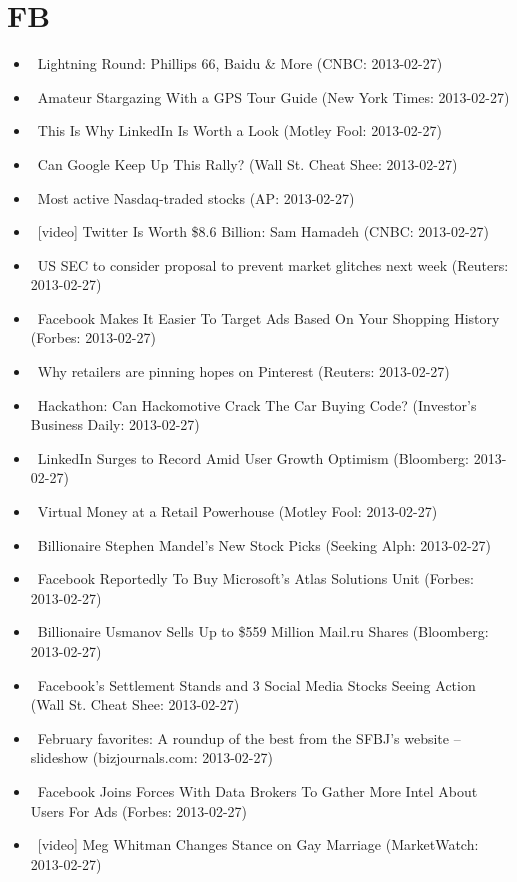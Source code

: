 \documentclass[11pt,asymmetric]{article}
\begin{document}
\section*{FB}
\begin{itemize}
\item\ Lightning Round: Phillips 66, Baidu \& More (CNBC: 2013-02-27)
\item\ Amateur Stargazing With a GPS Tour Guide (New York Times: 2013-02-27)
\item\ This Is Why LinkedIn Is Worth a Look (Motley Fool: 2013-02-27)
\item\ Can Google Keep Up This Rally? (Wall St. Cheat Shee: 2013-02-27)
\item\ Most active Nasdaq-traded stocks (AP: 2013-02-27)
\item\ [video] Twitter Is Worth \$8.6 Billion: Sam Hamadeh (CNBC: 2013-02-27)
\item\ US SEC to consider proposal to prevent market glitches next week (Reuters: 2013-02-27)
\item\ Facebook Makes It Easier To Target Ads Based On Your Shopping History (Forbes: 2013-02-27)
\item\ Why retailers are pinning hopes on Pinterest (Reuters: 2013-02-27)
\item\ Hackathon: Can Hackomotive Crack The Car Buying Code? (Investor's Business Daily: 2013-02-27)
\item\ LinkedIn Surges to Record Amid User Growth Optimism (Bloomberg: 2013-02-27)
\item\ Virtual Money at a Retail Powerhouse (Motley Fool: 2013-02-27)
\item\ Billionaire Stephen Mandel's New Stock Picks (Seeking Alph: 2013-02-27)
\item\ Facebook Reportedly To Buy Microsoft's Atlas Solutions Unit (Forbes: 2013-02-27)
\item\ Billionaire Usmanov Sells Up to \$559 Million Mail.ru Shares (Bloomberg: 2013-02-27)
\item\ Facebook’s Settlement Stands and 3 Social Media Stocks Seeing Action (Wall St. Cheat Shee: 2013-02-27)
\item\ February favorites: A roundup of the best from the SFBJ’s website – slideshow (bizjournals.com: 2013-02-27)
\item\ Facebook Joins Forces With Data Brokers To Gather More Intel About Users For Ads (Forbes: 2013-02-27)
\item\ [video] Meg Whitman Changes Stance on Gay Marriage (MarketWatch: 2013-02-27)

\end{itemize}
\end{document}
